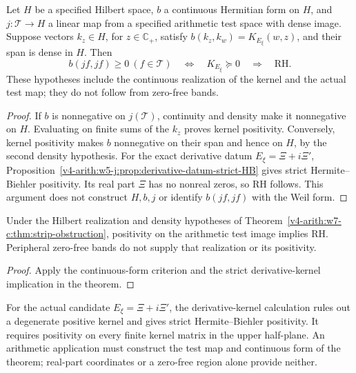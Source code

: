 \begin{theorem}
\label{v4-arith:w7-c:thm:strip-obstruction}
Let \(H\) be a specified Hilbert space, \(b\) a continuous Hermitian
form on \(H\), and \(j:\mathscr T\to H\) a linear map from a
specified arithmetic test space with dense image. Suppose vectors
\(k_z\in H\), for \(z\in\mathbb C_+\), satisfy
\(b(k_z,k_w)=K_{E_\xi}(w,z)\), and their span is dense in \(H\).
Then
\begin{equation}
\label{v4-arith:w7-c:eq:strip-to-half-plane-equiv}
 b(jf,jf)\geq0\ (f\in\mathscr T)
 \quad\Longleftrightarrow\quad K_{E_\xi}\succeq0
 \quad\Longrightarrow\quad\mathrm{RH}.
\end{equation}
These hypotheses include the continuous realization of the kernel
and the actual test map; they do not follow from zero-free bands.
\end{theorem}
\begin{proof}
If \(b\) is nonnegative on \(j(\mathscr T)\), continuity and density
make it nonnegative on \(H\). Evaluating on finite sums of the
\(k_z\) proves kernel positivity. Conversely, kernel positivity
makes \(b\) nonnegative on their span and hence on \(H\), by the
second density hypothesis. For the exact derivative datum
\(E_\xi=\Xi+i\Xi'\),
Proposition~\ref{v4-arith:w5-j:prop:derivative-datum-strict-HB}
gives strict Hermite--Biehler positivity. Its real part \(\Xi\)
has no nonreal zeros, so RH follows. This argument does not
construct \(H,b,j\) or identify \(b(jf,jf)\) with the Weil form.
\end{proof}

\begin{corollary}
\label{v4-arith:w7-c:cor:genuine-obstruction}
Under the Hilbert realization and density hypotheses of
Theorem~\ref{v4-arith:w7-c:thm:strip-obstruction}, positivity on
the arithmetic test image implies RH. Peripheral zero-free bands
do not supply that realization or its positivity.
\end{corollary}
\begin{proof}
Apply the continuous-form criterion and the strict derivative-kernel
implication in the theorem.
\end{proof}
\begin{remark}
\label{v4-arith:w7-c:rem:lagarias-conrey-li}
For the actual candidate \(E_\xi=\Xi+i\Xi'\), the derivative-kernel
calculation rules out a degenerate positive kernel and gives strict
Hermite--Biehler positivity. It requires positivity on every finite
kernel matrix in the upper half-plane. An arithmetic application
must construct the test map and continuous form of the theorem;
real-part coordinates or a zero-free region alone provide neither.
\end{remark}

